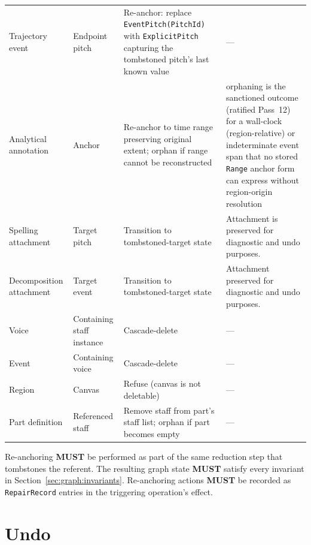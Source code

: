 \documentclass[11pt,letterpaper]{report}
\newcounter{requirement}[chapter]
\newcommand{\MUST}{\textbf{MUST}}
\begin{document}
\begin{longtable}{p{3.0cm} p{2.6cm} p{2.4cm} p{4.4cm}}
  Trajectory event & Endpoint pitch &
  Re-anchor: replace \texttt{EventPitch(PitchId)} with
  \texttt{ExplicitPitch} capturing the tombstoned pitch's last
  known value &
  --- \\

  Analytical annotation & Anchor &
  Re-anchor to time range preserving original extent; orphan if
  range cannot be reconstructed &
  orphaning is the sanctioned outcome (ratified Pass~12) for a
  wall-clock (region-relative) or indeterminate event span that
  no stored \texttt{Range} anchor form can express without
  region-origin resolution \\

  Spelling attachment & Target pitch &
  Transition to tombstoned-target state &
  Attachment is preserved for diagnostic and undo purposes. \\

  Decomposition attachment & Target event &
  Transition to tombstoned-target state &
  Attachment preserved for diagnostic and undo purposes. \\

  Voice & Containing staff instance &
  Cascade-delete &
  --- \\

  Event & Containing voice &
  Cascade-delete &
  --- \\

  Region & Canvas &
  Refuse (canvas is not deletable) &
  --- \\

  Part definition & Referenced staff &
  Remove staff from part's staff list; orphan if part becomes
  empty &
  --- \\

  \bottomrule
\end{longtable}

\begin{requirement}
  \label{req:semops:synchronous-reanchoring}
  Re-anchoring \MUST{} be performed as part of the same reduction
  step that tombstones the referent. The resulting graph state
  \MUST{} satisfy every invariant in
  Section~\ref{sec:graph:invariants}. Re-anchoring actions \MUST{}
  be recorded as \texttt{RepairRecord} entries in the triggering
  operation's effect.
\end{requirement}

\section{Undo}
\label{sec:semops:undo}
\end{document}
